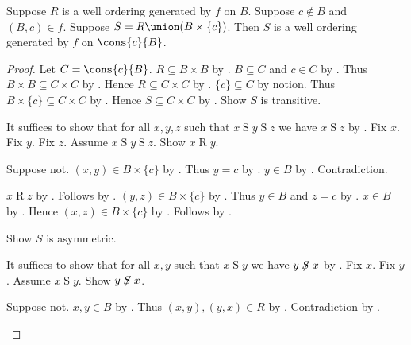 \begin{lemma}\label{generated_well_ordering_adjoin}
    Suppose $R$ is a well ordering generated by $f$ on $B$.
    Suppose $c\notin B$ and $(B,c)\in f$.
    Suppose $S=R\union(B\times\{c\})$.
    Then $S$ is a well ordering generated by $f$ on $\cons{c}{B}$.
\end{lemma}
\begin{proof}
    Let $C=\cons{c}{B}$.
    $R\subseteq B\times B$ by .
    $B\subseteq C$ and $c\in C$ by .
    Thus $B\times B\subseteq C\times C$ by .
    Hence $R\subseteq C\times C$ by .
    $\{c\}\subseteq C$ by notion.
    Thus $B\times\{c\}\subseteq C\times C$ by .
    Hence $S\subseteq C\times C$ by .
    Show $S$ is transitive.
    \begin{subproof}
        It suffices to show that for all $x,y,z$ such that $x\mathrel{S}y\mathrel{S}z$
            we have $x\mathrel{S}z$ by .
        Fix $x$.
        Fix $y$.
        Fix $z$.
        Assume $x\mathrel{S}y\mathrel{S}z$.
        Show $x\mathrel{R}y$.
        \begin{subproof}
            Suppose not.
            $(x,y)\in B\times\{c\}$ by .
            Thus $y=c$ by .
            $y\in B$ by .
            Contradiction.
        \end{subproof}
        \begin{byCase}
            $x\mathrel{R}z$ by .
            Follows by .
            $(y,z)\in B\times\{c\}$ by .
            Thus $y\in B$ and $z=c$ by .
            $x\in B$ by .
            Hence $(x,z)\in B\times\{c\}$ by .
            Follows by .
        \end{byCase}
    \end{subproof}

    Show $S$ is asymmetric.
    \begin{subproof}
        It suffices to show that for all $x,y$ such that $x\mathrel{S}y$
            we have $y\not\mathrel{S}x$ by .
        Fix $x$.
        Fix $y$.
        Assume $x\mathrel{S}y$.
        Show $y\not\mathrel{S}x$.
        \begin{subproof}
            Suppose not.
            $x,y\in B$ by .
            Thus $(x,y),(y,x)\in R$ by .
            Contradiction by .
        \end{subproof}
    \end{subproof}


\end{proof}
